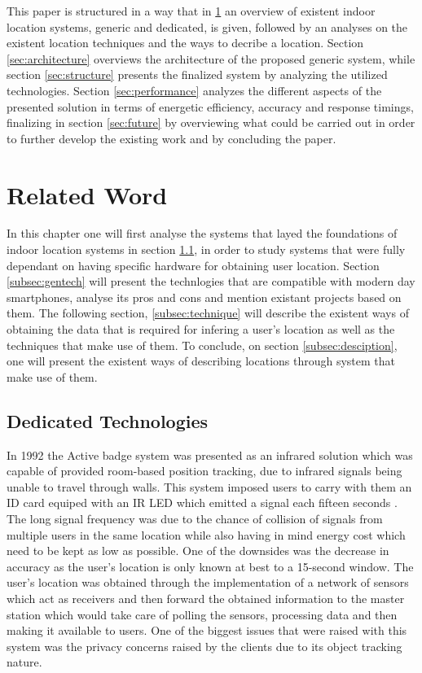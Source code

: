 \documentclass[a4paper]{IEEEtran}
\begin{document}

This paper is structured in a way that in \ref{sec:related} an overview of existent indoor location systems, generic and dedicated, is given, followed by an analyses on the existent location techniques and the ways to decribe a location. Section \ref{sec:architecture} overviews the architecture of the proposed generic system, while section \ref{sec:structure} presents the finalized system by analyzing the utilized technologies. Section \ref{sec:performance} analyzes the different aspects of the presented solution in terms of energetic efficiency, accuracy and response timings, finalizing in section \ref{sec:future} by overviewing what could be carried out in order to further develop the existing work and by concluding the paper.


\section{Related Word}
\label{sec:related}

In this chapter one will first analyse the systems that layed the foundations of indoor location systems in section \ref{subsec:dedicated}, in order to study systems that were fully dependant on having specific hardware for obtaining user location. Section \ref{subsec:gentech} will present the technlogies that are compatible with modern day smartphones, analyse its pros and cons and mention existant projects based on them. The following section, \ref{subsec:technique} will describe the existent ways of obtaining the data that is required for infering a user's location as well as the techniques that make use of them. To conclude, on section \ref{subsec:desciption}, one will present the existent ways of describing locations through system that make use of them.

\subsection{Dedicated Technologies}
\label{subsec:dedicated}

In 1992 the Active badge system \cite{badge} was presented as an infrared solution which was capable of provided room-based position tracking, due to infrared signals being unable to travel through walls. This system imposed users to carry with them an ID card equiped with an IR LED which emitted a signal each fifteen seconds \cite{badge1, badge2}. The long signal frequency was due to the chance of collision of signals from multiple users in the same location while also having in mind energy cost which need to be kept as low as possible. One of the downsides was the decrease in accuracy as the user's location is only known at best to a 15-second window. The user's location was obtained  through the implementation of a network of sensors which act as receivers and then forward the obtained information to the master station which would take care of polling the sensors, processing data and then making it available to users. One of the biggest issues that were raised with this system was the privacy concerns raised by the clients due to its object tracking nature.
\end{document}
